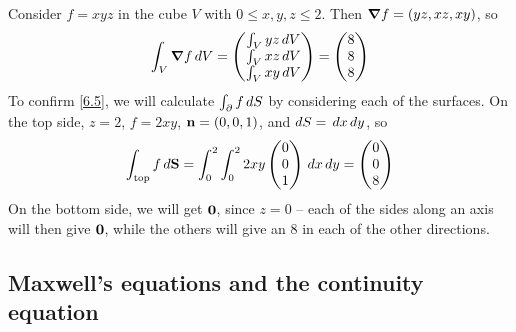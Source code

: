 \documentclass{../../template/note}
\begin{document}
    \begin{example*}
        Consider \(f = xyz\) in the cube \(V\) with \(0 \leq x, y, z \leq 2\). Then \(\grad f = (yz, xz, xy)\), so
        \begin{align*}
            \int_V \grad f \D V = \begin{pmatrix}
             \int_V yz \D V \\
             \int_V xz \D V \\
             \int_V xy \D V \\
            \end{pmatrix} = \begin{pmatrix}
             8 \\
             8 \\
             8 \\
            \end{pmatrix}
        \end{align*}
        To confirm \cref{6.5}, we will calculate \(\int_{\partial} f \,d{S}\) by considering each of the surfaces. On the top side, \(z=2\), \(f=2xy\), \(\V n = (0, 0, 1)\), and \(dS = \,d{x} \,d{y}\), so
        \begin{align*}
            \int_\text{top} f \, d\V S = \int_0^2 \int_0^2 2xy \begin{pmatrix}
             0 \\
             0 \\
             1 \\
            \end{pmatrix} \D x \D y = \begin{pmatrix}
             0 \\
             0 \\
             8 \\
            \end{pmatrix}
        \end{align*}
        On the bottom side, we will get \(\V 0\), since \(z=0\) -- each of the sides along an axis will then give \(\V 0\), while the others will give an 8 in each of the other directions.       
    \end{example*}
    
    \subsection{Maxwell's equations and the continuity equation}
\end{document}
